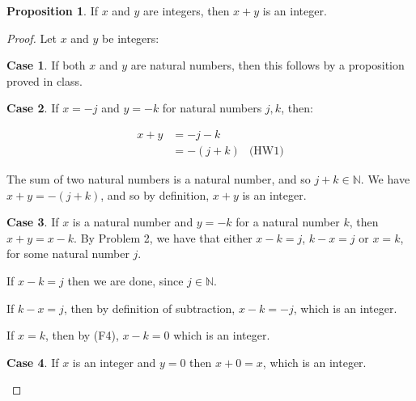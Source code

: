 \documentclass[12pt, letterpaper]{article}
\newcommand{\N}{\mathbb{N}}
\theoremstyle{definition} %
\newtheorem*{prop}{Proposition}
\newtheorem{case}{Case}[subsection]
\begin{document}
\begin{prop}
    If $x$ and $y$ are integers, then $x+y$ is an integer.

    \begin{proof} 
        Let $x$ and $y$ be integers:

        \begin{case} 
            If both $x$ and $y$ are natural numbers, then this follows by a 
            proposition proved in class.
        \end{case}

        \begin{case} 
            If $x= -j$ and $y= -k$ for natural numbers $j,k$, then:

            \begin{align*}
                x+y &= -j - k  \\
                    &= -(j+k)  &\text{(HW1)}
            \end{align*}

            The sum of two natural numbers is a natural number,
            and so $j+k \in \N$. We have $x+y=-(j+k)$, and so by definition, $x+y$ 
            is an integer.
        \end{case}

        \begin{case} 
            If $x$ is a natural number and $y= -k$ for a natural number $k$, 
            then $x+y = x-k$. By Problem 2, we have that either $x-k=j$, $k-x=j$
            or $x=k$, for some natural number $j$.

            If $x-k=j$ then we are done, since $j \in \N$.

            If $k-x=j$, then by definition of subtraction, $x-k=-j$, which is an
            integer.

            If $x=k$, then by (F4), $x-k=0$ which is an integer.
        \end{case}

        \begin{case} 
            If $x$ is an integer and $y=0$ then $x+0=x$, which is an integer.
        \end{case}

    \end{proof}
\end{prop}

\subsection{}
\end{document}
